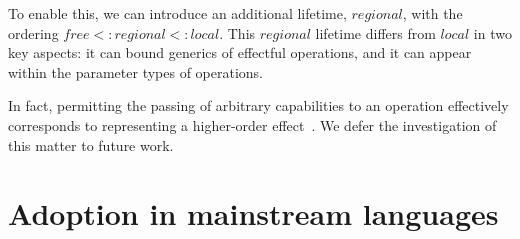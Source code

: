 \documentclass[acmsmall,review,screen]{acmart}
\begin{document}
To enable this, we can introduce an additional lifetime, $regional$, with the ordering $free <: regional <: local$.
This $regional$ lifetime differs from $local$ in two key aspects: it can bound generics of effectful operations, and it can appear within the parameter types of operations.

In fact, permitting the passing of arbitrary capabilities to an operation effectively corresponds to representing a higher-order effect~\cite{wu2014effect, zhang2020handling, van2022handling}.
We defer the investigation of this matter to future work.










\section{Adoption in mainstream languages} \label{sec:mainstream}

%
\end{document}
